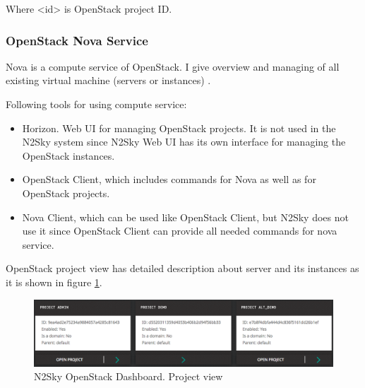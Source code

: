 Where <id> is OpenStack project ID.

\subsubsection{OpenStack Nova Service}\label{OpenStack Nova Service}

Nova is a compute service of OpenStack. I give overview and managing of all existing virtual machine (servers or instances) \cite{Markelov2016}. 

Following tools for using compute service:
\begin{itemize}
\item Horizon. Web UI for managing OpenStack projects. It is not used in the N2Sky system since N2Sky Web UI has its own interface for managing the OpenStack instances.
\item OpenStack Client, which includes commands for Nova as well as for OpenStack projects.
\item Nova Client, which can be used like OpenStack Client, but N2Sky does not use it since OpenStack Client can provide all needed commands for nova service. 
\end{itemize}


OpenStack project view has detailed description about server and its instances as it is shown in figure \ref{fig:openstack_dashboard_projects}. 

\begin{figure}[htbp]
\begin{center}
  \includegraphics[width=\linewidth]{components/4/pics/openstack_dashboard_projects.png}
  \caption{N2Sky OpenStack Dashboard. Project view}
  \label{fig:openstack_dashboard_projects}
\end{center}
\end{figure}

